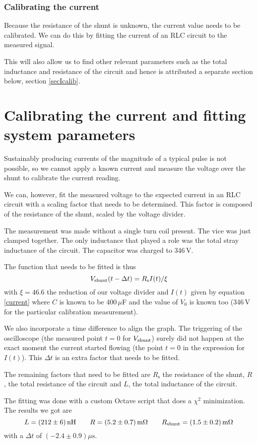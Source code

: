 \subsubsection{Calibrating the current}
Because the resistance of the shunt is unknown, the current value needs to 
be calibrated. We can do this by fitting the current of an RLC circuit to 
the measured signal.

This will also allow us to find other relevant parameters such as the total 
inductance and resistance of the circuit and hence is attributed a separate 
section below, section \ref{secIcalib}.











\section{Calibrating the current and fitting system parameters 
\label{secIcalib}}
Sustainably producing currents of the magnitude of a typical pulse is not 
possible, so we cannot apply a known current and measure the voltage over 
the shunt to calibrate the current reading.

We can, however, fit the measured voltage to the expected current in an RLC 
circuit with a scaling factor that needs to be determined. This factor is 
composed of the resistance of the shunt, scaled by the voltage divider. 

The measurement was made without a single turn coil present. The vice was 
just clamped together. The only inductance that played a role was the total 
stray inductance of the circuit. The capacitor was charged to 346\,V.

The function that needs to be fitted is thus
$$
V_\mathrm{shunt}(t - \Delta t) = R_\mathrm s I(t) / \xi
$$
with $\xi = 46.6$ the reduction of our voltage divider and $I(t)$ given by 
equation \ref{current} where $C$ is known to be 400\,$\mu$F and the value 
of $V_0$ is known too (346\,V for the particular calibration measurement).

We also incorporate a time difference to align the graph. The triggering of 
the oscilloscope (the measured point $t = 0$ for $V_\mathrm{shunt}$) surely did not 
happen at the exact moment the current started flowing (the point $t = 0$ 
in the expression for $I(t)$). This $\Delta t$ is an extra factor that 
needs to be fitted.

The remaining factors that need to be fitted are $R_\mathrm s$ the 
resistance of the shunt, $R$, the total resistance of the circuit and $L$, 
the total inductance of the circuit.

The fitting was done with a custom Octave script that does a $\chi^2$ 
minimization. The results we got are
$$
L = (212 \pm 6)\,\mathrm{nH}
\qquad
R = (5.2 \pm 0.7)\,\mathrm{m}\Omega
\qquad
R_\mathrm{shunt} = (1.5 \pm 0.2)\,\mathrm{m}\Omega
$$
with a $\Delta t$ of $(-2.4 \pm 0.9)\mu\mathrm s$.









